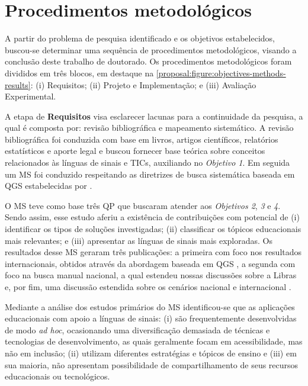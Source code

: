 \section{Procedimentos metodológicos}

A partir do problema de pesquisa identificado e os objetivos estabelecidos, buscou-se determinar uma sequência de procedimentos metodológicos, visando a conclusão deste trabalho de doutorado. Os procedimentos metodológicos foram divididos em três blocos, em destaque na \autoref{proposal:figure:objectives-methods-results}: (i) Requisitos; (ii) Projeto e Implementação; e (iii) Avaliação Experimental.

A etapa de \textbf{Requisitos} visa esclarecer lacunas para a continuidade da pesquisa, a qual é composta por: revisão bibliográfica e mapeamento sistemático. A revisão bibliográfica foi conduzida com base em livros, artigos científicos, relatórios estatísticos e aporte legal \cite{Gil2016} e buscou fornecer base teórica sobre conceitos relacionados às línguas de sinais e TICs, auxiliando no \textit{Objetivo 1}. Em seguida um MS foi conduzido respeitando as diretrizes de busca sistemática baseada em QGS estabelecidas por .

O MS teve como base três QP que buscaram atender aos \textit{Objetivos 2}, \textit{3} e \textit{4}. Sendo assim, esse estudo aferiu a existência de contribuições com potencial de (i) identificar os tipos de soluções investigadas; (ii) classificar os tópicos educacionais mais relevantes; e (iii) apresentar as línguas de sinais mais exploradas. Os resultados desse MS geraram três publicações: a primeira com foco nos resultados internacionais, obtidos através da abordagem baseada em QGS \cite{FalvoJr2020_FIE}, a segunda com foco na busca manual nacional, a qual estendeu nossas discussões sobre a Libras \cite{FalvoJr2020_SBIE} e, por fim, uma discussão estendida sobre os cenários nacional e internacional \cite{FalvoJr2020_RENOTE}.

Mediante a análise dos estudos primários do MS identificou-se que as aplicações educacionais com apoio a línguas de sinais: (i) são frequentemente desenvolvidas de modo \textit{ad hoc}, ocasionando uma diversificação demasiada de técnicas e tecnologias de desenvolvimento, as quais geralmente focam em acessibilidade, mas não em inclusão; (ii) utilizam diferentes estratégias e tópicos de ensino e (iii) em sua maioria, não apresentam possibilidade de compartilhamento de seus recursos educacionais ou tecnológicos. 

